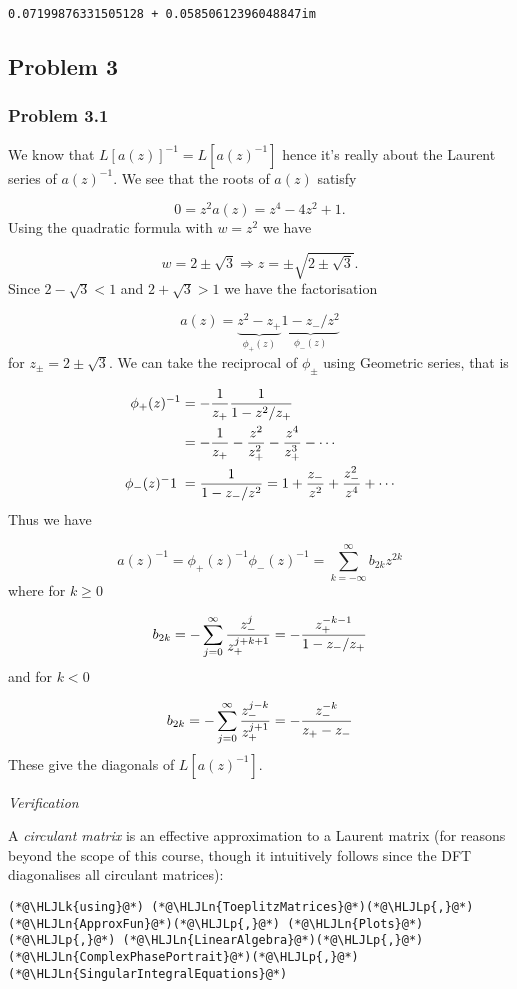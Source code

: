 \documentclass[12pt,landscape]{article}
\newcommand{\HLJLk}[1]{\textcolor[RGB]{148,91,176}{\textbf{#1}}}
\newcommand{\HLJLn}[1]{#1}
\newcommand{\HLJLp}[1]{#1}
\def\addtab#1={#1\;&=}
\def\ccr{\\\addtab}
\def\addtab#1={#1\;&=}
\def\ccr{\\\addtab}
\begin{document}
{\begin{lstlisting}
0.07199876331505128 + 0.05850612396048847im
\end{lstlisting}


\subsection{Problem 3}
\subsubsection{Problem 3.1}
We know that $L[a(z)]^{-1} = L[a(z)^{-1}]$ hence it's really about the Laurent series of $a(z)^{-1}$. We see that the roots of $a(z)$ satisfy

\[
0 =z^2 a(z) = z^4 - 4z^2 + 1.
\]
Using the quadratic formula with $w = z^2$ we have

\[
w = 2 \pm \sqrt 3 \Rightarrow z = \pm \sqrt{2 \pm \sqrt 3}.
\]
Since $2 - \sqrt 3 < 1$ and $2 + \sqrt 3 > 1$ we have the factorisation

\[
a(z) = \underbrace{z^2 - z_+}_{\phi_+(z)} \underbrace{1 - z_-/z^2}_{\phi_-(z)}
\]
for $z_{\pm} = 2 \pm \sqrt3$. We can take the reciprocal of $\phi_{\pm}$ using Geometric series, that is


\begin{align*}
\phi_+(z)^{-1} &= -{1 \over z_+} {1 \over 1 - z^2/z_+}  \ccr
= -{1 \over z_+} - {z^2 \over z_+^2} - {z^4 \over z_+^3} - \cdots \ccr
\phi_-(z)^{-1} = {1 \over 1- z_- /z^2} = 1 + {z_- \over z^2} + {z_-^2 \over z^4} + \cdots
\end{align*}
Thus we have

\[
a(z)^{-1} = \phi_+(z)^{-1} \phi_-(z)^{-1} =  \sum_{k=-\infty}^\infty b_{2k} z^{2k}
\]
where for $k \geq 0$

\[
b_{2k} =- \sum_{j=0}^\infty {z_-^j \over z_+^{j+k+1}} = - {z_+^{-k-1} \over 1 - z_-/z_+}
\]
and for $k < 0$

\[
b_{2k} =- \sum_{j=0}^\infty {z_-^{j-k} \over z_+^{j+1}} = - {z_-^{-k} \over z_+ - z_-}
\]
These give the diagonals of $L[a(z)^{-1}]$.

\emph{Verification}

A \emph{circulant matrix} is an effective approximation to a Laurent matrix (for reasons beyond the scope of this course, though it intuitively follows since the DFT diagonalises all circulant matrices):


\begin{lstlisting}
(*@\HLJLk{using}@*) (*@\HLJLn{ToeplitzMatrices}@*)(*@\HLJLp{,}@*) (*@\HLJLn{ApproxFun}@*)(*@\HLJLp{,}@*) (*@\HLJLn{Plots}@*)(*@\HLJLp{,}@*) (*@\HLJLn{LinearAlgebra}@*)(*@\HLJLp{,}@*) (*@\HLJLn{ComplexPhasePortrait}@*)(*@\HLJLp{,}@*) (*@\HLJLn{SingularIntegralEquations}@*)


\end{lstlisting}}
\end{document}
